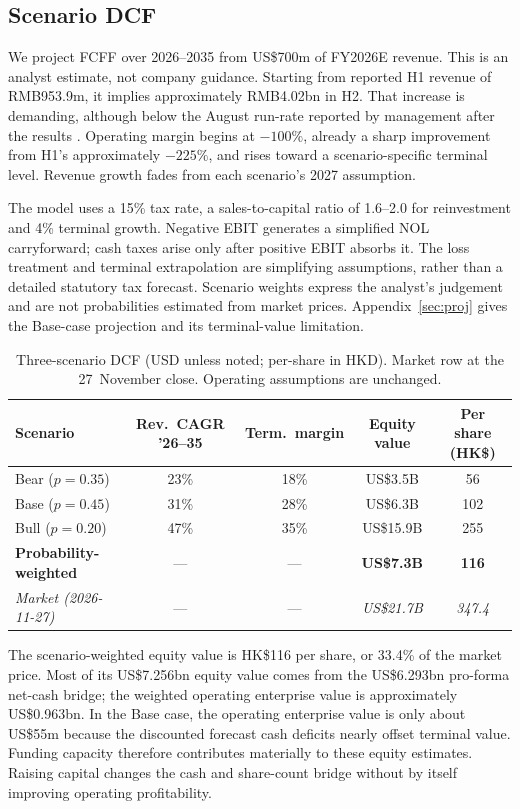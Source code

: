 \documentclass[11pt]{article}
\begin{document}
\subsection{Scenario DCF}
We project FCFF over 2026--2035 from US\$700m of FY2026E revenue. This is an analyst estimate, not company guidance. Starting from reported H1 revenue of RMB953.9m, it implies approximately RMB4.02bn in H2. That increase is demanding, although below the August run-rate reported by management after the results \citep{interim2026,caixin2026}. Operating margin begins at $-100\%$, already a sharp improvement from H1's approximately $-225\%$, and rises toward a scenario-specific terminal level. Revenue growth fades from each scenario's 2027 assumption.

The model uses a 15\% tax rate, a sales-to-capital ratio of 1.6--2.0 for reinvestment and 4\% terminal growth. Negative EBIT generates a simplified NOL carryforward; cash taxes arise only after positive EBIT absorbs it. The loss treatment and terminal extrapolation are simplifying assumptions, rather than a detailed statutory tax forecast. Scenario weights express the analyst's judgement and are not probabilities estimated from market prices. Appendix~\ref{sec:proj} gives the Base-case projection and its terminal-value limitation.

\begin{table}[H]
\centering
\caption{Three-scenario DCF (USD unless noted; per-share in HKD). Market row at the 27~November close. Operating assumptions are unchanged.}
\label{tab:dcf}
\setlength{\tabcolsep}{4pt}
\begin{tabular}{lcccc}
\toprule
Scenario & Rev.\ CAGR '26--35 & Term.\ margin & Equity value & Per share (HK\$) \\
\midrule
Bear ($p=0.35$) & 23\% & 18\% & US\$3.5B & 56 \\
Base ($p=0.45$) & 31\% & 28\% & US\$6.3B & 102 \\
Bull ($p=0.20$) & 47\% & 35\% & US\$15.9B & 255 \\
\midrule
\textbf{Probability-weighted} & --- & --- & \textbf{US\$7.3B} & \textbf{116} \\
\midrule
\textit{Market (2026-11-27)} & --- & --- & \textit{US\$21.7B} & \textit{347.4} \\
\bottomrule
\end{tabular}
\end{table}

The scenario-weighted equity value is HK\$116 per share, or 33.4\% of the market price. Most of its US\$7.256bn equity value comes from the US\$6.293bn pro-forma net-cash bridge; the weighted operating enterprise value is approximately US\$0.963bn. In the Base case, the operating enterprise value is only about US\$55m because the discounted forecast cash deficits nearly offset terminal value. Funding capacity therefore contributes materially to these equity estimates. Raising capital changes the cash and share-count bridge without by itself improving operating profitability.
\end{document}

